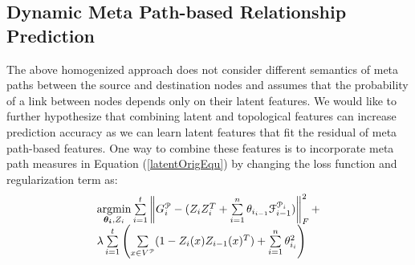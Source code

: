 \subsection{Dynamic Meta Path-based Relationship Prediction}

The above homogenized approach does not consider different semantics of meta paths between the source and destination nodes and assumes that the probability of a link between nodes depends only on their latent features. %
We would like to further hypothesize that combining latent and topological features can increase prediction accuracy as we can learn latent features that fit the residual of meta path-based features. One way to combine these features is to incorporate meta path measures in Equation (\ref{latentOrigEqu}) by changing the loss function and regularization term as:
\begin{equation}\label{latentMetaEqu}
    \begin{array}{l}
\operatorname*{argmin}\limits_{\boldsymbol{\theta_i},Z_i}\sum\limits_{i=1}^{t}\left \| G^\mathcal{P}_i - (Z_{i}Z_{i}^T + \sum\limits_{i=1}^{n}\theta_{i_{i-1}} \mathcal{F}^{\mathcal{P}_i}_{i-1}) \right \|^2_F+
\\ 
\lambda \sum\limits_{i=1}^{t}\left(\sum\limits_{x \in V^\mathcal{P}}(1-Z_{i}(x)Z_{i-1}(x)^T) + \sum\limits_{i=1}^{n} \theta_{i_i}^2\right)\\
    \end{array}
\end{equation}
